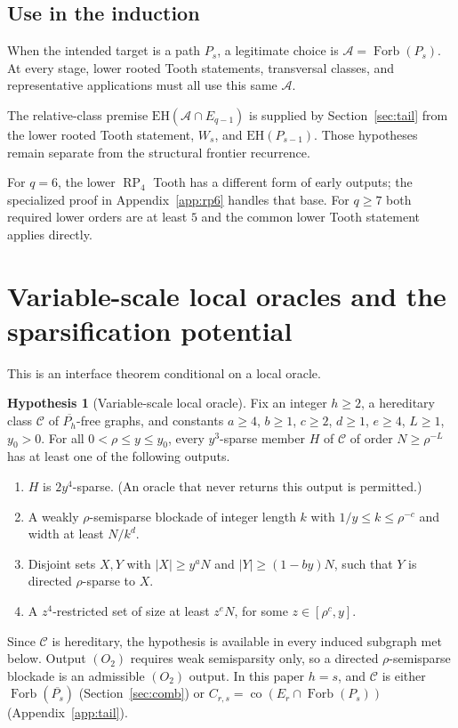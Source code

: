 \documentclass[11pt,a4paper]{article}
\theoremstyle{definition}
\newtheorem{hypothesis}[theorem]{Hypothesis}
\theoremstyle{remark}
\numberwithin{equation}{section}
\DeclareMathOperator{\Forb}{Forb}
\DeclareMathOperator{\co}{co}
\newcommand{\EH}{\mathrm{EH}}
\begin{document}
\subsection{Use in the induction}
When the intended target is a path \(P_{s}\), a legitimate choice is \(\mathcal A=\Forb(P_{s})\). At every stage, lower rooted Tooth statements, transversal classes, and representative applications must all use this same \(\mathcal A\).

The relative-class premise \(\EH(\mathcal A\cap E_{q-1})\) is supplied by Section~\ref{sec:tail} from the lower rooted Tooth statement, \(W_s\), and \(\EH(P_{s-1})\). Those hypotheses remain separate from the structural frontier recurrence.

For \(q=6\), the lower \(\operatorname{RP}_{4}\) Tooth has a different form of early outputs; the specialized proof in Appendix~\ref{app:rp6} handles that base. For \(q\ge\allowbreak 7\) both required lower orders are at least \(5\) and the common lower Tooth statement applies directly.


\section{Variable-scale local oracles and the sparsification potential}\label{app:bootstrap}

This is an interface theorem conditional on a local oracle.

\begin{hypothesis}[Variable-scale local oracle]\label{hyp:oracle}
Fix an integer \(h\ge2\), a hereditary class \(\mathcal C\) of \(\overline{P_{h}}\)-free graphs, and constants \(a\ge 4\), \(b\ge 1\), \(c\ge 2\), \(d\ge 1\), \(e\ge 4\), \(L\ge 1\), \(y_{0}>0\). For all \(0<\rho\le y\le y_{0}\), every \(y^{3}\)-sparse member \(H\) of \(\mathcal C\) of order \(N\ge \rho^{-L}\) has at least one of the following outputs.
\begin{enumerate}[label=(\(O_{\arabic*}\))]
\item \(H\) is \(2y^{4}\)-sparse. (An oracle that never returns this output is permitted.)
\item A weakly \(\rho\)-semisparse blockade of integer length \(k\) with \(1/y\le k\le \rho^{-c}\) and width at least \(N/k^{d}\).
\item Disjoint sets \(X,Y\) with \(|X|\ge y^{a} N\) and \(|Y|\ge (1-by)N\), such that \(Y\) is directed \(\rho\)-sparse to \(X\).
\item A \(z^{4}\)-restricted set of size at least \(z^{e} N\), for some \(z\in[\rho^{c},y]\).
\end{enumerate}
\end{hypothesis}
Since \(\mathcal C\) is hereditary, the hypothesis is available in every induced subgraph met below. Output \((O_{2})\) requires weak semisparsity only, so a directed \(\rho\)-semisparse blockade is an admissible \((O_{2})\) output. In this paper \(h=s\), and \(\mathcal C\) is either \(\Forb(\overline{P_s})\) (Section~\ref{sec:comb}) or \(C_{r,s}=\co(E_r\cap\Forb(P_s))\) (Appendix~\ref{app:tail}).
\end{document}
